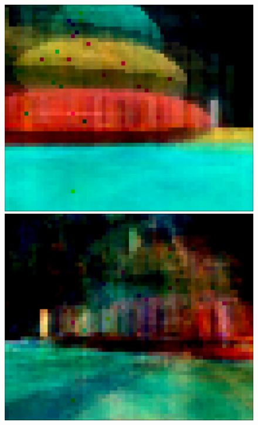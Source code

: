 \begin{figure}[p]
  \centering
  \includegraphics[width=0.36\textheight]{images/workflow/object_morphing/Morph1.png} \\[\picVdist]
  \includegraphics[width=0.36\textheight]{images/workflow/object_morphing/Morph2.png} \\[\picVdist]

\end{figure}
